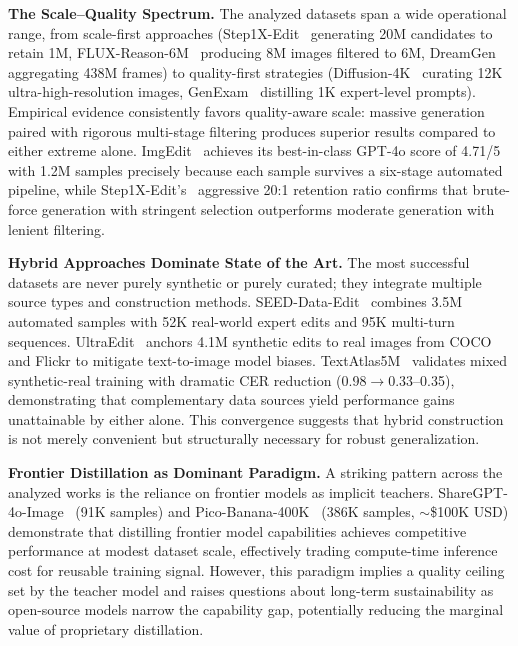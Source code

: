 \textbf{The Scale--Quality Spectrum.}
The analyzed datasets span a wide operational range, from scale-first approaches (Step1X-Edit~\citep{liu2025step1x} generating 20M candidates to retain 1M, FLUX-Reason-6M~\citep{fang2025flux} producing 8M images filtered to 6M, DreamGen~\citep{jang2025dreamgen} aggregating 438M frames) to quality-first strategies (Diffusion-4K~\citep{zhang2025diffusion} curating 12K ultra-high-resolution images, GenExam~\citep{wang2025genexam} distilling 1K expert-level prompts). Empirical evidence consistently favors quality-aware scale: massive generation paired with rigorous multi-stage filtering produces superior results compared to either extreme alone. ImgEdit~\citep{ye2025imgedit} achieves its best-in-class GPT-4o score of 4.71/5 with 1.2M samples precisely because each sample survives a six-stage automated pipeline, while Step1X-Edit's~\citep{liu2025step1x} aggressive 20:1 retention ratio confirms that brute-force generation with stringent selection outperforms moderate generation with lenient filtering.

\textbf{Hybrid Approaches Dominate State of the Art.}
The most successful datasets are never purely synthetic or purely curated; they integrate multiple source types and construction methods. SEED-Data-Edit~\citep{ge2024seed} combines 3.5M automated samples with 52K real-world expert edits and 95K multi-turn sequences. UltraEdit~\citep{zhao2024ultraedit} anchors 4.1M synthetic edits to real images from COCO and Flickr to mitigate text-to-image model biases. TextAtlas5M~\citep{wang2025textatlas5m} validates mixed synthetic-real training with dramatic CER reduction (0.98$\rightarrow$0.33--0.35), demonstrating that complementary data sources yield performance gains unattainable by either alone. This convergence suggests that hybrid construction is not merely convenient but structurally necessary for robust generalization.

\textbf{Frontier Distillation as Dominant Paradigm.}
A striking pattern across the analyzed works is the reliance on frontier models as implicit teachers. ShareGPT-4o-Image~\citep{chen2025sharegpt} (91K samples) and Pico-Banana-400K~\citep{qian2025pico} (386K samples, $\sim$\$100K USD) demonstrate that distilling frontier model capabilities achieves competitive performance at modest dataset scale, effectively trading compute-time inference cost for reusable training signal. However, this paradigm implies a quality ceiling set by the teacher model and raises questions about long-term sustainability as open-source models narrow the capability gap, potentially reducing the marginal value of proprietary distillation.

